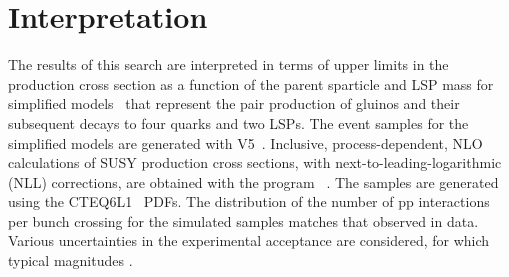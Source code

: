 \clearpage
\section{Interpretation}

The results of this search are interpreted in terms of upper limits in
the production cross section as a function of the parent sparticle and
LSP mass for simplified models~\cite{Alwall:2008ag, Alwall:2008va,
  sms} that represent the pair production of gluinos and their
subsequent decays to four quarks and two LSPs. The event samples for
the simplified models are generated with \MADGRAPH V5~\cite{madgraph}.
Inclusive, process-dependent, NLO calculations of SUSY production
cross sections, with next-to-leading-logarithmic (NLL) corrections,
are obtained with the program \PROSPINO~\cite{Beenakker:1996ch,
  PhysRevD.80.095004,PhysRevLett.102.111802, PhysRevD.80.095004,
  1126-6708-2009-12-041, doi:10.1142/S0217751X11053560,
  susy-nlo-nll}. The samples are generated using the
CTEQ6L1~\cite{Pumplin:2002vw} PDFs. The distribution of the number of
pp interactions per bunch crossing for the simulated samples matches
that observed in data. Various uncertainties in the experimental
acceptance are considered, for which typical magnitudes . 

